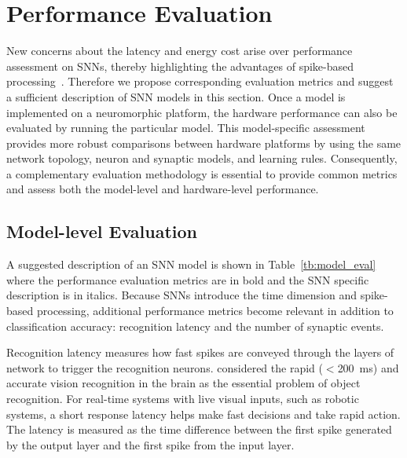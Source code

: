 \section{Performance Evaluation}
\label{sec:eval}
New concerns about the latency and energy cost arise over performance assessment on SNNs, thereby highlighting the advantages of spike-based processing~\citep{tan2015bench}.
Therefore we propose corresponding evaluation metrics and suggest a sufficient description of SNN models in this section.
Once a model is implemented on a neuromorphic platform, the hardware performance can also be evaluated by running the particular model.
This model-specific assessment provides more robust comparisons between hardware platforms by using the same network topology, neuron and synaptic models, and learning rules. 
Consequently, a complementary evaluation methodology is essential to provide common metrics and assess both the model-level and hardware-level performance.


\subsection{Model-level Evaluation}
\label{subsec:model}

A suggested description of an SNN model is shown in Table~\ref{tb:model_eval} where the performance evaluation metrics are in bold and the SNN specific description is in italics.
Because SNNs introduce the time dimension and spike-based processing, additional performance metrics become relevant in addition to classification accuracy: recognition latency and the number of synaptic events.

Recognition latency measures how fast spikes are conveyed through the layers of network to trigger the recognition neurons.
\citet{dicarlo2012does} considered the rapid ($<$200~ms) and accurate vision recognition in the brain as the essential problem of object recognition.
For real-time systems with live visual inputs, such as robotic systems, a short response latency helps make fast decisions and take rapid action.
The latency is measured as the time difference between the first spike generated by the output layer and the first spike from the input layer.

